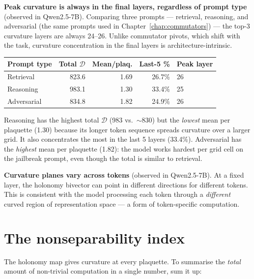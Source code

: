 \documentclass[11pt, twoside, openright]{memoir}
\numberwithin{equation}{chapter}
\begin{document}
\begin{finding}
\textbf{Peak curvature is always in the final layers, regardless of
prompt type} (observed in Qwen2.5-7B).
Comparing three prompts --- retrieval, reasoning, and adversarial
(the same prompts used in Chapter~\ref{chap:commutators}) --- the
top-3 curvature layers are always 24--26.  Unlike commutator pivots,
which shift with the task, curvature concentration in the final layers
is architecture-intrinsic.

\smallskip
\begin{center}
\renewcommand{\arraystretch}{1.2}\small
\begin{tabular}{@{} l r r r l @{}}
\toprule
\textbf{Prompt type} & \textbf{Total $\mathcal{D}$} &
  \textbf{Mean/plaq.} & \textbf{Last-5 \%} & \textbf{Peak layer} \\
\midrule
Retrieval & 823.6 & 1.69 & 26.7\% & 26 \\
Reasoning & 983.1 & 1.30 & 33.4\% & 25 \\
Adversarial & 834.8 & 1.82 & 24.9\% & 26 \\
\bottomrule
\end{tabular}
\end{center}
\smallskip

Reasoning has the highest total $\mathcal{D}$ (983 vs.\ $\sim$830) but
the \emph{lowest} mean per plaquette (1.30) because its longer token
sequence spreads curvature over a larger grid.  It also concentrates
the most in the last 5 layers (33.4\%).  Adversarial has the
\emph{highest} mean per plaquette (1.82): the model works hardest
per grid cell on the jailbreak prompt, even though the total is
similar to retrieval.
\end{finding}

\begin{finding}
\textbf{Curvature planes vary across tokens} (observed in Qwen2.5-7B).
At a fixed layer, the holonomy bivector can point in different
directions for different tokens.  This is consistent with the model
processing each token through a \emph{different} curved region of
representation space --- a form of token-specific computation.
\end{finding}

\section{The nonseparability index}

The holonomy map gives curvature at every plaquette.  To summarise the
\emph{total} amount of non-trivial computation in a single number,
sum it up:
\end{document}
